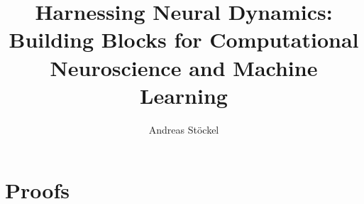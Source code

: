 \documentclass[letterpaper,oneside,12pt]{memoir}
\title{Harnessing Neural Dynamics:\\Building Blocks for Computational Neuroscience and Machine Learning}
\author{Andreas Stöckel}
\begin{document}
	\frontmatter
	
	
	
	
	
	
	

	\tableofcontents*
	\clearpage
	\listoffigures
	\clearpage
	\listoftables

	\mainmatter
	

	\appendix
	\chapter{Proofs}

	\backmatter

	\printbibliography
\end{document}
